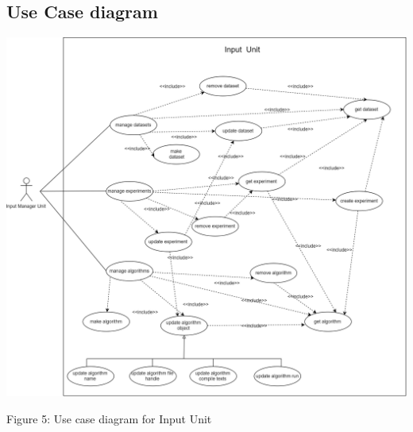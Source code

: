 \subsection{Use Case diagram}
   \includegraphics[width=\textwidth]{input_unit/images/input_unit_use_case.png}
    \begin{center}
    	\small{Figure 5: Use case diagram for Input Unit}
    \end{center}